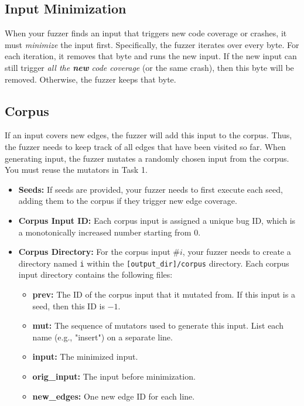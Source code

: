 \documentclass[letterpaper,11pt]{article}
\begin{document}
\subsection{Input Minimization}


When your fuzzer finds an input that triggers new code coverage or crashes, it must \textit{minimize} the input first.
Specifically, the fuzzer iterates over every byte.
For each iteration, it removes that byte and runs the new input.
If the new input can still trigger \textit{all the \textbf{new} code coverage} (or the same crash), then this byte will be removed.
Otherwise, the fuzzer keeps that byte.

\subsection{Corpus}
\label{subsec:corpus}




If an input covers new edges, the fuzzer will add this input to the corpus.
Thus, the fuzzer needs to keep track of all edges that have been visited so far.
When generating input, the fuzzer mutates a randomly chosen input from the corpus.
You must reuse the mutators in Task 1.

\begin{itemize}
    \item \textbf{Seeds:} If seeds are provided, your fuzzer needs to first execute each seed, adding them to the corpus if they trigger new edge coverage.
    \item \textbf{Corpus Input ID:} Each corpus input is assigned a unique bug ID, which is a monotonically increased number starting from 0.
    \item \textbf{Corpus Directory:} For the corpus input $\#i$, your fuzzer needs to create a directory named \texttt{i} within the \texttt{[output\_dir]/corpus} directory. Each corpus input directory contains the following files:
        \begin{itemize}
            \item \textbf{prev:} The ID of the corpus input that it mutated from. If this input is a seed, then this ID is $-1$.
            \item \textbf{mut:} The sequence of mutators used to generate this input. List each name (e.g., "insert") on a separate line.
            \item \textbf{input:} The minimized input.
            \item \textbf{orig_input:} The input before minimization.
            \item \textbf{new_edges:} One new edge ID for each line.
        \end{itemize}
\end{itemize}
\end{document}
